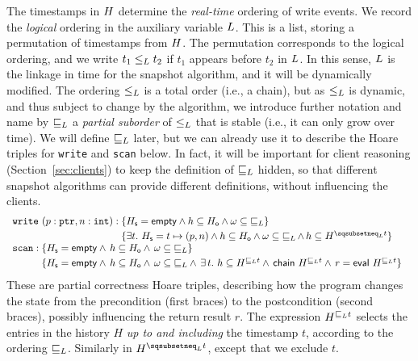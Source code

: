 The timestamps in $H$ determine the \emph{real-time} ordering of write
events. We record the \emph{logical} ordering in the auxiliary variable
$L$. This is a list, storing a permutation of timestamps from
$H$. The permutation corresponds to the logical ordering, and we
write $t_1 \mathrel{\leq_L} t_2$ if $t_1$ appears before $t_2$ in $L$. In
this sense, $L$ is the linkage in time for the snapshot
algorithm, and it will be dynamically modified. The ordering $\mathrel{\leq_L}$
is a total order (i.e., a chain), but as $\mathrel{\leq_L}$ is dynamic, and thus
subject to change by the algorithm, we introduce further notation and
name by $\mathrel{\sqsubseteq_L}$ a \emph{partial suborder} of $\mathrel{\leq_L}$ that is
stable (i.e., it can only grow over time). We will define $\mathrel{\sqsubseteq_L}$ later, but we can already use it to
describe the Hoare triples for {\tt write} and {\tt scan} below. In
fact, it will be important for client reasoning
(Section~\ref{sec:clients}) to keep the definition of $\mathrel{\sqsubseteq_L}$ hidden,
so that different snapshot algorithms can provide different
definitions, without influencing the clients.  
%
\begin{equation}
\begin{array}{l}
\mathtt{write}\ (p : \mathtt{ptr}, n : \mathtt{int}) : 
\!\!\!\begin{array}[t]{l}
\{\hists = \hempty \wedge h \subseteq \histO
           \wedge \omega \subseteq {\jleq}\}\\[3pt]
\{\exists t\ldot\, \hists = t \mapsto (p, n) \wedge h \subseteq \histO \wedge
  \omega \subseteq {\jleq}\,{\wedge}\, h \subseteq H^{\hbox{}\sqsubsetneq_\ordlist t}\}
\end{array}\\
%
\mathtt{scan} : 
\!\!\!\begin{array}[t]{l}
\{\hists = \hempty \wedge\, h \subseteq \histO \wedge\,
          \omega \subseteq {\jleq}\}\\[3pt]
\{\hists = \hempty \wedge\, h \subseteq \histO \wedge\, \omega \subseteq {\jleq} \wedge\, \exists\, t\ldot\, %
           h \subseteq H^{\hbox{}\sqsubseteq_\ordlist t} \wedge\,
           \mathsf{chain}\ H^{\hbox{}\sqsubseteq_\ordlist t} \wedge\, r = \mathsf{eval}\ {H^{\hbox{}\sqsubseteq_\ordlist t}}\}
\end{array}
\end{array}
\label{eq:specs}
\end{equation}
%
These are partial correctness Hoare triples, describing how the
program changes the state from the precondition (first braces) to the
postcondition (second braces), possibly influencing the return result
$r$.
%
The expression $H^{\hbox{}\sqsubseteq_L t}$ selects the entries
in the history $H$ \emph{up to and including} the timestamp $t$,
according to the ordering $\sqsubseteq_L$. Similarly in
$H^{\hbox{}\sqsubsetneq_\ordlist t}$, except that we exclude $t$.
%

